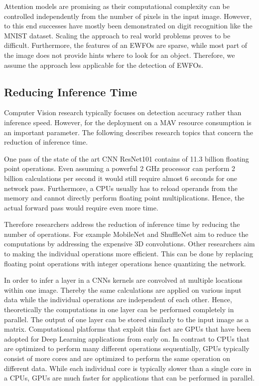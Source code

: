 Attention models are promising as their computational complexity can be controlled independently from the number of pixels in the input image. However, to this end successes have mostly been demonstrated on digit recognition like the MNIST dataset. Scaling the approach to real world problems proves to be difficult. Furthermore, the features of an \acp{EWFO} are sparse, while most part of the image does not provide hints where to look for an object. Therefore, we assume the approach less applicable for the detection of \acp{EWFO}.

\subsection{Reducing Inference Time}

Computer Vision research typically focuses on detection accuracy rather than inference speed. However, for the deployment on a \ac{MAV} resource consumption is an important parameter. The following describes research topics that concern the reduction of inference time.

One pass of the state of the art \ac{CNN} ResNet101 contains of 11.3 billion floating point operations. Even assuming a powerful 2 GHz processor can perform 2 billion calculations per second it would still require almost 6 seconds for one network pass. Furthermore, a \acp{CPU} usually has to reload operands from the memory and cannot directly perform floating point multiplications. Hence, the actual forward pass would require even more time.


Therefore researchers address the reduction of inference time by reducing the number of operations. For example MobileNet and ShuffleNet aim to reduce the computations by addressing the expensive 3D convolutions. Other researchers aim to making the individual operations more efficient. This can be done by replacing floating point operations with integer operations hence quantizing the network.

In order to infer a layer in a \acp{CNN} kernels are convolved at multiple locations within one image. Thereby the same calculations are applied on various input data while the individual operations are independent of each other. Hence, theoretically the computations in one layer can be performed completely in parallel. The output of one layer can be stored similarly to the input image as a matrix. Computational platforms that exploit this fact are \acp{GPU} that have been adopted for Deep Learning applications from early on. In contrast to \acp{CPU} that are optimized to perform many different operations sequentially, \acp{GPU} typically consist of more cores and are optimized to perform the same operation on different data. While each individual core is typically slower than a single core in a \acp{CPU}, \acp{GPU} are much faster for applications that can be performed in parallel.

